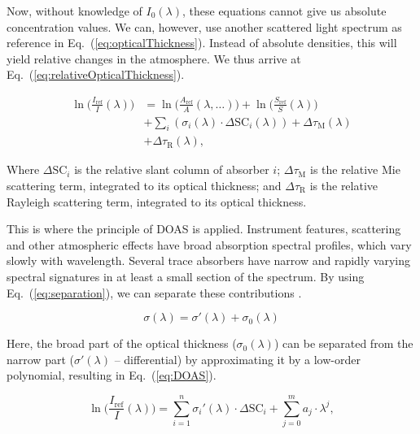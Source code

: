 Now, without knowledge of $I_{0}(\lambda)$, these equations cannot give
us absolute concentration values. We can, however, use another scattered
light spectrum as reference in Eq.~(\ref{eq:opticalThickness}). Instead
of absolute densities, this will yield relative changes in the
atmosphere. We thus arrive at Eq.~(\ref{eq:relativeOpticalThickness}).

\begin{align}
      \label{eq:relativeOpticalThickness}
      \ln\Big( \frac{I_\mathrm{ref}}{I}(\lambda) \Big) &= \ln\Big( \frac{A_\mathrm{ref}}{A}(\lambda,\ldots) \Big) + \ln\Big( \frac{S_\mathrm{ref}}{S}(\lambda) \Big) \nonumber\\
      &+  \sum_{i} (\sigma_{i}(\lambda) \cdot \Delta \mathrm{SC}_{i}(\lambda)) + \Delta \tau_\mathrm{M}(\lambda) \nonumber\\
      &+ \Delta \tau_\mathrm{R}(\lambda),
\end{align}

Where $\Delta \mathrm{SC}_{i}$  is the relative slant column of absorber
$i$; $\Delta \tau_\mathrm{M}$  is the relative Mie scattering term,
integrated to its optical thickness; and $\Delta \tau_\mathrm{R}$ is the
relative Rayleigh scattering term, integrated to its optical thickness.


This is where the principle of DOAS is applied. Instrument features,
scattering and other atmospheric effects have broad absorption spectral
profiles, which vary slowly with wavelength. Several trace absorbers
have narrow and rapidly varying spectral signatures in at least a small
section of the spectrum. By using Eq.~(\ref{eq:separation}), we can
separate these contributions \cite{Danckaert2015}.

\begin{equation}
      \label{eq:separation}
      \sigma(\lambda) = \sigma{'}(\lambda) + \sigma_{0}(\lambda)
\end{equation}

Here, the broad part of the optical thickness ($\sigma_{0}(\lambda)$)
can be separated from the narrow part ($\sigma{'}(\lambda)$ --
differential) by approximating it by a low-order polynomial, resulting
in Eq.~(\ref{eq:DOAS}).

\begin{equation}
      \label{eq:DOAS}
      \ln\Big( \frac{I_\mathrm{ref}}{I}(\lambda) \Big) = \sum_{i = 1}^{n} \sigma_{i}{'}(\lambda) \cdot \Delta \mathrm{SC}_{i} + \sum_{j = 0}^{m} a_{j} \cdot
      \lambda^{j},
\end{equation}

